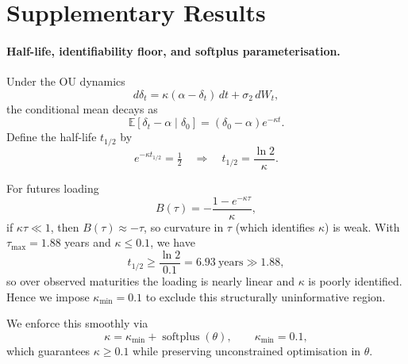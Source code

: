 \documentclass[sigconf, authorversion=true, nonacm=true]{acmart}
\begin{document}
\section{Supplementary Results}
\label{app:supplementary}

\paragraph{Half-life, identifiability floor, and softplus parameterisation.}
Under the OU dynamics
\[
d\delta_t=\kappa(\alpha-\delta_t)\,dt+\sigma_2\,dW_t,
\]
the conditional mean decays as
\[
\mathbb{E}[\delta_t-\alpha\mid \delta_0]=(\delta_0-\alpha)e^{-\kappa t}.
\]
Define the half-life \(t_{1/2}\) by
\[
e^{-\kappa t_{1/2}}=\tfrac12
\quad\Rightarrow\quad
t_{1/2}=\frac{\ln 2}{\kappa}.
\]

For futures loading
\[
B(\tau)=-\frac{1-e^{-\kappa\tau}}{\kappa},
\]
if \(\kappa\tau\ll 1\), then \(B(\tau)\approx-\tau\), so curvature in \(\tau\) (which identifies \(\kappa\)) is weak.  
With \(\tau_{\max}=1.88\) years and \(\kappa\le 0.1\), we have
\[
t_{1/2}\ge \frac{\ln 2}{0.1}=6.93\ \text{years}\gg 1.88,
\]
so over observed maturities the loading is nearly linear and \(\kappa\) is poorly identified.  
Hence we impose \(\kappa_{\min}=0.1\) to exclude this structurally uninformative region.

We enforce this smoothly via
\[
\kappa=\kappa_{\min}+\operatorname{softplus}(\theta),\qquad \kappa_{\min}=0.1,
\]
which guarantees \(\kappa\ge 0.1\) while preserving unconstrained optimisation in \(\theta\).
\end{document}
